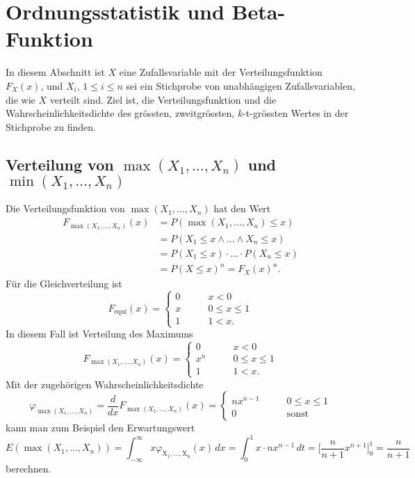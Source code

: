%
%
%
\section{Ordnungsstatistik und Beta-Funktion
\label{dreieck:section:ordnungsstatistik}}
In diesem Abschnitt ist $X$ eine Zufallsvariable mit der Verteilungsfunktion
$F_X(x)$, und $X_i$, $1\le i\le n$ sei ein Stichprobe von unabhängigen
Zufallsvariablen, die wie $X$ verteilt sind.
Ziel ist, die Verteilungsfunktion und die Wahrscheinlichkeitsdichte
des grössten, zweitgrössten, $k$-t-grössten Wertes in der Stichprobe
zu finden.

\subsection{Verteilung von $\operatorname{max}(X_1,\dots,X_n)$ und
$\operatorname{min}(X_1,\dots,X_n)$
\label{dreieck:subsection:minmax}}
Die Verteilungsfunktion von $\operatorname{max}(X_1,\dots,X_n)$ hat
den Wert
\begin{align*}
F_{\operatorname{max}(X_1,\dots,X_n)}(x)
&=
P(\operatorname{max}(X_1,\dots,X_n) \le x)
\\
&=
P(X_1\le x\wedge \dots \wedge X_n\le x)
\\
&=
P(X_1\le x) \cdot \ldots \cdot P(X_n\le x)
\\
&=
P(X\le x)^n
=
F_X(x)^n.
\end{align*}
Für die Gleichverteilung ist
\[
F_{\text{equi}}(x)
=
\begin{cases}
0&\qquad x< 0
\\
x&\qquad 0\le x\le 1
\\
1&\qquad 1<x.
\end{cases}
\]
In diesem Fall ist Verteilung des Maximums
\[
F_{\operatorname{max}(X_1,\dots,X_n)}(x)
=
\begin{cases}
0&\qquad x<0\\
x^n&\qquad 0\le x\le 1\\
1&\qquad 1 < x.
\end{cases}
\]
Mit der zugehörigen Wahrscheinlichkeitsdichte
\[
\varphi_{\operatorname{max}(X_1,\dots,X_n)}
=
\frac{d}{dx}
F_{\operatorname{max}(X_1,\dots,X_n)}(x)
=
\begin{cases}
nx^{n-1}&\qquad 0\le x\le 1\\
0       &\qquad \text{sonst}
\end{cases}
\]
kann man zum Beispiel den Erwartungswert
\[
E(\operatorname{max}(X_1,\dots,X_n))
=
\int_{-\infty}^\infty 
x
\varphi_{\operatorname{X_1,\dots,X_n}}(x)
\,dx
=
\int_{0}^1 x\cdot nx^{n-1}\,dt
=
\biggl[
\frac{n}{n+1}x^{n+1}
\biggr]_0^1
=
\frac{n}{n+1}
\]
berechnen.

